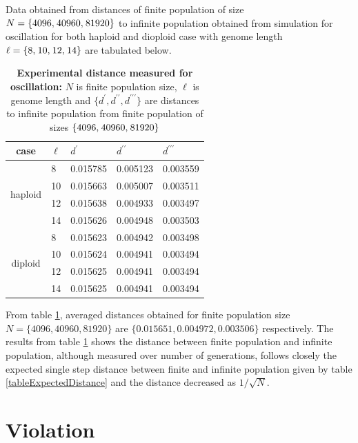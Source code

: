 Data obtained from distances of finite population of size $N = \{4096, \hspace{0.01in} 40960, \hspace{0.01in} 81920\}$ to infinite population obtained from simulation 
for oscillation for both haploid and dioploid case with genome length $\ell = \{8, \hspace{0.01in} 10, \hspace{0.01in} 12, \hspace{0.01in} 14\}$ are tabulated below.
\begin{table}[ht]
\caption{\textbf{Experimental distance measured for oscillation:} $N$ is finite population size, $\ell$ is genome length and $\{d^\prime, d^{\prime\prime}, d^{\prime\prime\prime}\}$ are distances to infinite population from finite population of sizes $\{4096, \hspace{0.01in} 40960, \hspace{0.01in} 81920\}$ }
\centering
\begin{tabularx}{0.75\textwidth}{ c *{4}{X}}
\toprule
case & $\ell$ & $d^\prime$ & $d^{\prime\prime}$ & $d^{\prime\prime\prime}$\\
\midrule
\multirow{4}{*}{haploid} 	& 8 & 0.015785 & 0.005123 & 0.003559 \\
 				& 10 & 0.015663 & 0.005007 & 0.003511 \\ 
 			 	& 12 & 0.015638 & 0.004933 & 0.003497 \\
 	 			& 14 & 0.015626 & 0.004948 & 0.003503 \\ 
\midrule
\multirow{4}{*}{diploid} 	& 8 & 0.015623 & 0.004942 & 0.003498 \\
				& 10 & 0.015624 & 0.004941 & 0.003494 \\
			 	& 12 & 0.015625 & 0.004941 & 0.003494 \\
	 			& 14 & 0.015625 & 0.004941 & 0.003494 \\
\bottomrule

\end{tabularx}
\label{tableDistanceOsc}
\end{table}


From table \ref{tableDistanceOsc}, averaged distances obtained for finite population size $N = \{4096,  40960,  81920\}$ are $\{0.015651, 0.004972, 0.003506\} $ respectively.
The results from table \ref{tableDistanceOsc} shows the distance between finite population and infinite population, although measured over number of generations, follows closely 
the expected single step distance between finite and infinite population given by  table \ref{tableExpectedDistance} and the distance decreased as $1/\sqrt{N}$.

\section{Violation}

